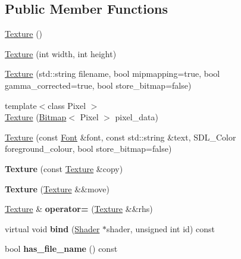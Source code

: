 \subsection*{Public Member Functions}
\begin{DoxyCompactItemize}
\item 
\mbox{\hyperlink{class_texture_a6c275e3f186675ff6ed73ccf970e552f}{Texture}} ()
\item 
\mbox{\hyperlink{class_texture_a197b839d8525505209f4288071cc7185}{Texture}} (int width, int height)
\item 
\mbox{\hyperlink{class_texture_a84ada24c7d5dec8fca128752a6459106}{Texture}} (std\+::string filename, bool mipmapping=true, bool gamma\+\_\+corrected=true, bool store\+\_\+bitmap=false)
\item 
{\footnotesize template$<$class Pixel $>$ }\\\mbox{\hyperlink{class_texture_a503b9fb36275ab110763bf9f51420539}{Texture}} (\mbox{\hyperlink{class_bitmap}{Bitmap}}$<$ Pixel $>$ pixel\+\_\+data)
\item 
\mbox{\hyperlink{class_texture_a38ee78c007ed592860dc4c35948f57da}{Texture}} (const \mbox{\hyperlink{class_font}{Font}} \&font, const std\+::string \&text, S\+D\+L\+\_\+\+Color foreground\+\_\+colour, bool store\+\_\+bitmap=false)
\item 
\mbox{\label{class_texture_abdf82a7e3262db9452fb0fd994d01c69}} 
{\bfseries Texture} (const \mbox{\hyperlink{class_texture}{Texture}} \&copy)
\item 
\mbox{\label{class_texture_a3509443fca1d7a53de22fa83d7f882a2}} 
{\bfseries Texture} (\mbox{\hyperlink{class_texture}{Texture}} \&\&move)
\item 
\mbox{\label{class_texture_a18d2cb10fecc26f4b6692b04d877cafa}} 
\mbox{\hyperlink{class_texture}{Texture}} \& {\bfseries operator=} (\mbox{\hyperlink{class_texture}{Texture}} \&\&rhs)
\item 
\mbox{\label{class_texture_ac8ae77bfd20815c814606ad179835ec4}} 
virtual void {\bfseries bind} (\mbox{\hyperlink{class_shader}{Shader}} $\ast$shader, unsigned int id) const
\item 
\mbox{\label{class_texture_aa254021d42806acb75447992acdef0b0}} 
bool {\bfseries has\+\_\+file\+\_\+name} () const

\end{DoxyCompactItemize}
